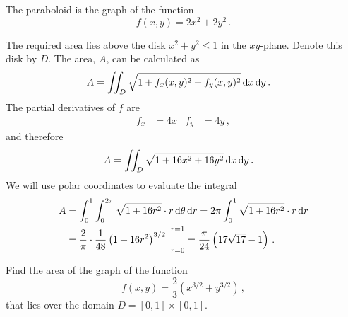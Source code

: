 \begin{solution}
The paraboloid is the graph of the function
\[
f(x,y) = 2x^2 + 2y^2\,.
\]

\begin{wrapfigure}{r}{0.35\textwidth}
\begin{center}
\end{center}
\end{wrapfigure}

The required area lies above the disk $x^2 + y^2 \leq 1$ in the $xy$-plane. Denote this disk by $D$. The area, $A$, can be calculated as
\begin{align*}
A &= \iint_D \sqrt{1 + f_x(x,y)^2 + f_y(x,y)^2} \,\mathrm{d} x \,\mathrm{d} y\,.
\end{align*}
The partial derivatives of $f$ are
\begin{align*}
f_x &= 4x & f_y &= 4y \,,
\end{align*}
and therefore
\begin{align*}
A &= \iint_D \sqrt{1 + 16 x^2 + 16y^2} \,\mathrm{d} x \,\mathrm{d} y\,.
\end{align*}
We will use polar coordinates to evaluate the integral
\begin{align*}
A &= \int_0^1 \int_0^{2\pi} \sqrt{1 + 16 r^2} \cdot r \,\mathrm{d} \theta \,\mathrm{d} r 
= 2\pi \int_0^1 \sqrt{1 + 16 r^2} \cdot r \,\mathrm{d} r \\
&= \frac 2 \pi \cdot \frac 1{48} \left(1 + 16 r^2\right)^{3/2} \bigg|_{r=0}^{r=1} 
= \frac \pi{24} \left( 17 \sqrt{17} - 1 \right)\,.
\end{align*}
\end{solution}

\begin{question}
Find the area of the graph of the function 
\[
f(x,y) = \frac 23 \left(x^{3/2} + y^{3/2}\right)\,,
\]
that lies over the domain $D=[0,1] \times [0,1]$.
\end{question}

